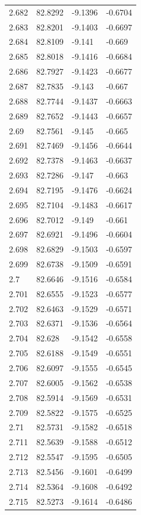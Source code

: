 \begin{tabular}{llll}
2.682 & 82.8292 & -9.1396 & -0.6704 \\
2.683 & 82.8201 & -9.1403 & -0.6697 \\
2.684 & 82.8109 & -9.141 & -0.669 \\
2.685 & 82.8018 & -9.1416 & -0.6684 \\
2.686 & 82.7927 & -9.1423 & -0.6677 \\
2.687 & 82.7835 & -9.143 & -0.667 \\
2.688 & 82.7744 & -9.1437 & -0.6663 \\
2.689 & 82.7652 & -9.1443 & -0.6657 \\
2.69 & 82.7561 & -9.145 & -0.665 \\
2.691 & 82.7469 & -9.1456 & -0.6644 \\
2.692 & 82.7378 & -9.1463 & -0.6637 \\
2.693 & 82.7286 & -9.147 & -0.663 \\
2.694 & 82.7195 & -9.1476 & -0.6624 \\
2.695 & 82.7104 & -9.1483 & -0.6617 \\
2.696 & 82.7012 & -9.149 & -0.661 \\
2.697 & 82.6921 & -9.1496 & -0.6604 \\
2.698 & 82.6829 & -9.1503 & -0.6597 \\
2.699 & 82.6738 & -9.1509 & -0.6591 \\
2.7 & 82.6646 & -9.1516 & -0.6584 \\
2.701 & 82.6555 & -9.1523 & -0.6577 \\
2.702 & 82.6463 & -9.1529 & -0.6571 \\
2.703 & 82.6371 & -9.1536 & -0.6564 \\
2.704 & 82.628 & -9.1542 & -0.6558 \\
2.705 & 82.6188 & -9.1549 & -0.6551 \\
2.706 & 82.6097 & -9.1555 & -0.6545 \\
2.707 & 82.6005 & -9.1562 & -0.6538 \\
2.708 & 82.5914 & -9.1569 & -0.6531 \\
2.709 & 82.5822 & -9.1575 & -0.6525 \\
2.71 & 82.5731 & -9.1582 & -0.6518 \\
2.711 & 82.5639 & -9.1588 & -0.6512 \\
2.712 & 82.5547 & -9.1595 & -0.6505 \\
2.713 & 82.5456 & -9.1601 & -0.6499 \\
2.714 & 82.5364 & -9.1608 & -0.6492 \\
2.715 & 82.5273 & -9.1614 & -0.6486 \\

\end{tabular}

